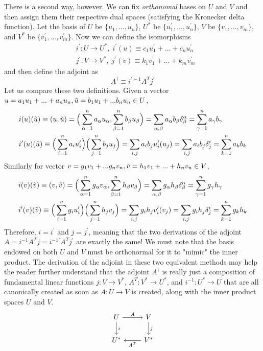 \documentclass{article}
\theoremstyle{remark}
\theoremstyle{definition}
\begin{document}
There is a second way, however. We can fix \textit{orthonomal} bases on $U$ and $V$ and then assign them their respective dual spaces (satisfying the Kronecker delta function). Let the basis of $U$ be $\{u_1, ..., u_n\}$, $U^*$ be $\{u_1^\prime, ..., u_n^\prime\}$, $V$ be $\{v_1, ..., v_m\}$, and $V^*$ be $\{v_1^\prime, ..., v_m^\prime\}$. Now we can define the isomorphisms 
\begin{align*}
    & i^\prime: U \longrightarrow U^*, \; i^\prime (u) \equiv c_1 u_1^\prime + ... + c_n u_n^\prime \\
    & j^\prime: V \longrightarrow V^*, \; j^\prime (v) \equiv k_1 v_1^\prime + ... + k_m v_m^\prime
\end{align*}
and then define the adjoint as 
\[A^\dagger \equiv i^{\prime -1} A^T j^\prime\]
Let us compare these two definitions. Given a vector $u = a_1 u_1 + ... + a_n u_n, \Tilde{u} = b_1 u_1 + ... b_n u_n \in U$, 
\begin{align*}
    &i(u)(\Tilde{u}) \equiv (u, \Tilde{u}) = \Big(\sum_{\alpha = 1}^n a_\alpha u_\alpha, \sum_{\beta = 1}^n b_\beta u_\beta \Big) = \sum_{\alpha, \beta} a_\alpha b_\beta \delta^\alpha_\beta = \sum_{\gamma=1}^n a_\gamma b_\gamma \\
    &i^\prime(u)(\Tilde{u}) \equiv \Big(\sum_{i=1}^n a_i u_i^\prime \Big) \Big( \sum_{j=1}^n b_j u_j \Big) = \sum_{i, j} a_i b_j u_i^\prime (u_j) = \sum_{i, j} a_i b_j \delta^i_j = \sum_{k=1}^n a_k b_k
\end{align*}
Similarly for vector $v = g_1 v_1 + ... g_n v_n, \Tilde{v} = h_1 v_1 + ... + h_n v_n \in V$, 
\begin{align*}
    &i(v)(\Tilde{v}) \equiv (v, \Tilde{v}) = \Big(\sum_{\alpha = 1}^n g_\alpha v_\alpha, \sum_{\beta = 1}^n h_\beta v_\beta \Big) = \sum_{\alpha, \beta} g_\alpha h_\beta \delta^\alpha_\beta = \sum_{\gamma=1}^n g_\gamma h_\gamma \\
    &i^\prime(v)(\Tilde{v}) \equiv \Big(\sum_{i=1}^n g_i u_i^\prime \Big) \Big( \sum_{j=1}^n h_j v_j \Big) = \sum_{i, j} g_i h_j v_i^\prime (v_j) = \sum_{i, j} g_i h_j \delta^i_j = \sum_{k=1}^n g_k h_k
\end{align*}
Therefore, $i = i^\prime$ and $j = j^\prime$, meaning that the two derivations of the adjoint $A = i^{-1} A^T j = i^{-1 \prime} A^T j^\prime$ are exactly the same! We must note that the basis endowed on both $U$ and $V$ must be orthonormal for it to "mimic" the inner product. The derivation of the adjoint in these two equivalent methods may help the reader further understand that the adjoint $A^\dagger$ is really just a composition of fundamental linear functions $j: V \longrightarrow V^*$, $A^T: V^* \longrightarrow U^*$, and $i^{-1}: U^* \longrightarrow U$ that are all canonically created as soon as $A: U \longrightarrow V$ is created, along with the inner product spaces $U$ and $V$. 
\[
  \begin{tikzcd}
    U \arrow{r}{A} \arrow{d}{i} & V \arrow{d}{j}\\
    U^* & V^* \arrow{l}{A^T}
  \end{tikzcd}
\]
\end{document}
